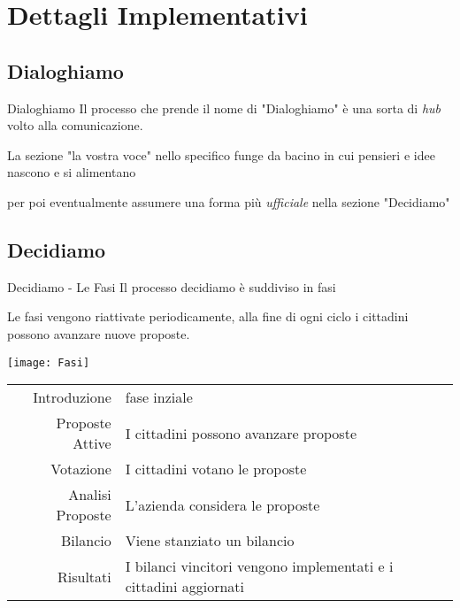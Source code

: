 \section{Dettagli Implementativi}

\subsection{Dialoghiamo}
\begin{frame}{Dialoghiamo}
  Il processo che prende il nome di "Dialoghiamo" è una sorta di \emph{hub} volto alla comunicazione.

  La sezione "la vostra voce" nello specifico funge da bacino in cui pensieri e idee nascono e si alimentano

  per poi eventualmente assumere una forma più \emph{ufficiale} nella sezione "Decidiamo"
\end{frame}
\subsection{Decidiamo}
\begin{frame}{Decidiamo - Le Fasi}
  Il processo decidiamo è suddiviso in fasi

  \pause
  Le fasi vengono riattivate periodicamente, alla fine di ogni ciclo i cittadini possono avanzare nuove proposte.


  \begin{center}
    \texttt{[image: Fasi]}
  \end{center}
\end{frame}
\begin{frame}

  \begin{table}
    \renewcommand\arraystretch{1.4}

    \begin{tabular}{@{\,}r <{\hskip 2pt} !{\foo} >{\raggedright\arraybackslash}p{5cm}}

      \addlinespace[1.5ex]
      Introduzione     & \small{fase inziale}                                                      \\
      Proposte Attive  & \small{I cittadini possono avanzare proposte}                             \\
      Votazione        & \small{I cittadini votano le proposte  }                                  \\
      Analisi Proposte & \small{L'azienda considera le proposte}                                   \\
      Bilancio         & \small{Viene stanziato un bilancio }                                      \\
      Risultati        & \small{I bilanci vincitori vengono implementati e i cittadini aggiornati} \\
    \end{tabular}
  \end{table}
\end{frame}

